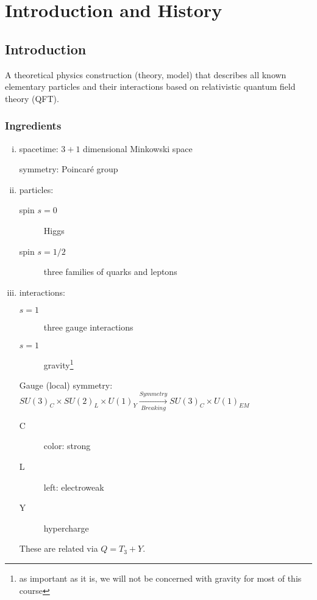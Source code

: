 
\chapter{Introduction and History}%
\label{cha:introduction_and_history}

\section{Introduction}%
\label{sec:introduction}

\begin{definition}
  A theoretical physics construction (theory, model) that describes all known elementary particles and their interactions based on relativistic quantum field theory (QFT).
\end{definition}

\subsection*{Ingredients}%

\begin{enumerate}[(i)]
  \item spacetime: $3 + 1$ dimensional Minkowski space\par
    symmetry: Poincar\'e group
  \item particles: 
    \begin{description}
      \item[spin $s = 0$] Higgs
      \item[spin $s = 1 / 2$] three families of quarks and leptons
    \end{description}
  \item interactions:
    \begin{description}
      \item[$s = 1$] three gauge interactions
      \item[$s = 1$] gravity\footnote{as important as it is, we will not be concerned with gravity for most of this course}
    \end{description}
    Gauge (local) symmetry: $SU(3)_C \times SU(2)_L \times U(1)_Y \xrightarrow[Breaking]{Symmetry} SU(3)_C \times U(1)_{EM}$
    \begin{description}
      \item[C] color: strong
      \item[L] left: electroweak
      \item[Y] hypercharge
    \end{description}
    These are related via $Q = T_3 + Y$.\par
\end{enumerate}

